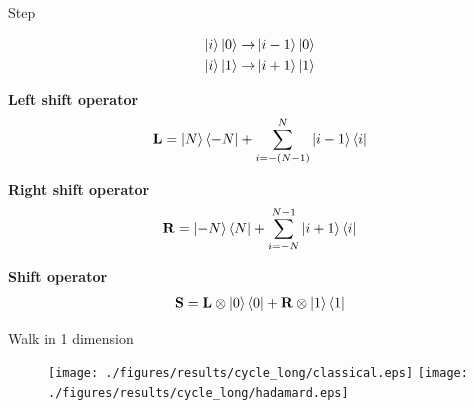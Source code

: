 \documentclass[aspectratio=169]{beamer}
\begin{document}
\begin{frame}{Step}

\vspace{-1.5cm}
\begin{align*}
\ket{i}\ket{0} \rightarrow& \ket{i-1}\ket{0} \\
\ket{i}\ket{1} \rightarrow& \ket{i+1}\ket{1}
\end{align*}

\pause

\textbf{Left shift operator}
\vspace{-0.5cm}
\begin{align*}
\mathbf{L} = \ket{N}\bra{-N} + \sum\limits_{i=-(N-1)}^{N} \ket{i-1}\bra{i}
\end{align*}

\pause

\textbf{Right shift operator}
\vspace{-0.5cm}
\begin{align*}
\mathbf{R} = \ket{-N}\bra{N} + \sum\limits_{i=-N}^{N-1} \ket{i+1}\bra{i} 
\end{align*}

\pause

\textbf{Shift operator}
\vspace{-0.5cm}
\begin{align*}
  \mathbf{S} = \mathbf{L}\otimes\ket{0}\bra{0} + \mathbf{R}\otimes\ket{1}\bra{1}
\end{align*}

\end{frame}

\begin{frame}{Walk in 1 dimension}
\begin{figure}[H]
  \centering
  \texttt{[image: ./figures/results/cycle\_long/classical.eps]}
  \texttt{[image: ./figures/results/cycle\_long/hadamard.eps]}
\end{figure}
\end{frame}
\end{document}
